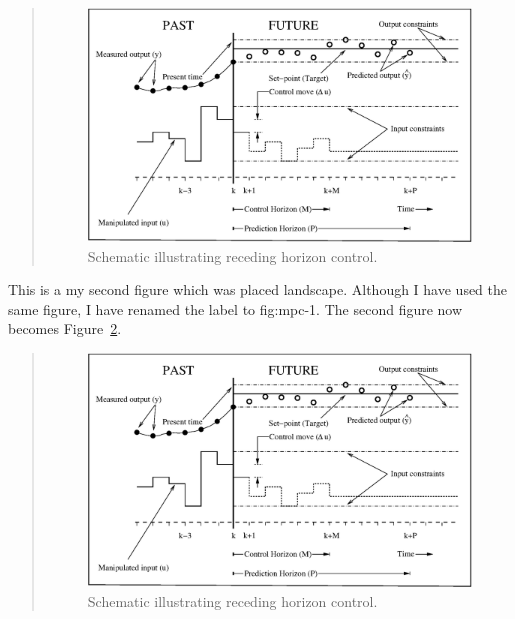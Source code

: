 \begin{landscape}
\renewcommand{\baselinestretch}{1}
\small\normalsize
\begin{quote}
\begin{figure}
\begin{center}
\includegraphics[width=8.2in]{mpc.eps}
\end{center}
\caption{Schematic illustrating receding horizon control.
\label{fig:mpc} }
\end{figure}
\end{quote}
\renewcommand{\baselinestretch}{2}
\small\normalsize
\end{landscape}

This is a my second figure which was placed landscape.  Although I have used the same figure, I have renamed the label to fig:mpc-1.  The second figure now becomes Figure~\ref{fig:mpc-1}.
\begin{landscape}
\renewcommand{\baselinestretch}{1}
\small\normalsize
\begin{quote}
\begin{figure}
\begin{center}
\includegraphics[width=8.2in]{mpc.eps}
\end{center}
\caption[Figure placed landscape on page]{Schematic illustrating receding horizon control. \label{fig:mpc-1}}
\end{figure}
\end{quote}
\renewcommand{\baselinestretch}{2}
\small\normalsize
\end{landscape}

